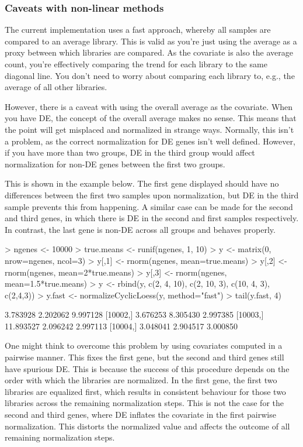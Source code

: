 \documentclass[12pt]{report}
\renewenvironment{Schunk}{\vspace{0pt}}{\vspace{0pt}}
\begin{document}
\subsubsection*{Caveats with non-linear methods}

The current implementation uses a fast approach, whereby all samples are compared to an average library.
This is valid as you're just using the average as a proxy between which libraries are compared.
As the covariate is also the average count, you're effectively comparing the trend for each library to the same diagonal line.
You don't need to worry about comparing each library to, e.g., the average of all other libraries.

However, there is a caveat with using the overall average as the covariate.
When you have DE, the concept of the overall average makes no sense.
This means that the point will get misplaced and normalized in strange ways.
Normally, this isn't a problem, as the correct normalization for DE genes isn't well defined.
However, if you have more than two groups, DE in the third group would affect normalization for non-DE genes between the first two groups.

This is shown in the example below.
The first gene displayed should have no differences between the first two samples upon normalization, but DE in the third sample prevents this from happening.
A similar case can be made for the second and third genes, in which there is DE in the second and first samples respectively.
In contrast, the last gene is non-DE across all groups and behaves properly.


\begin{Schunk}
\begin{Sinput}
> ngenes <- 10000
> true.means <- runif(ngenes, 1, 10)
> y <- matrix(0, nrow=ngenes, ncol=3)
> y[,1] <- rnorm(ngenes, mean=true.means)
> y[,2] <- rnorm(ngenes, mean=2*true.means)
> y[,3] <- rnorm(ngenes, mean=1.5*true.means)
> y <- rbind(y, c(2, 4, 10), c(2, 10, 3), c(10, 4, 3), c(2,4,3))	
> y.fast <- normalizeCyclicLoess(y, method="fast")
> tail(y.fast, 4)
\end{Sinput}
\begin{Soutput}
              [,1]     [,2]     [,3]
[10001,]  3.783928 2.202062 9.997128
[10002,]  3.676253 8.305430 2.997385
[10003,] 11.893527 2.096242 2.997113
[10004,]  3.048041 2.904517 3.000850
\end{Soutput}
\end{Schunk}

One might think to overcome this problem by using covariates computed in a pairwise manner.
This fixes the first gene, but the second and third genes still have spurious DE.
This is because the success of this procedure depends on the order with which the libraries are normalized.
In the first gene, the first two libraries are equalized first, which results in consistent behaviour for those two libraries across the remaining normalization steps.
This is not the case for the second and third genes, where DE inflates the covariate in the first pairwise normalization.
This distorts the normalized value and affects the outcome of all remaining normalization steps.
\end{document}
